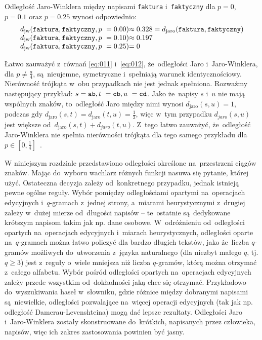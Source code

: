 \documentclass{praca1}
\begin{document}
\begin{example}
Odległość Jaro-Winklera między napisami \verb|faktura| i~\verb|faktyczny| dla $p = 0$, $p = 0.1$ oraz $p = 0.25$ wynosi odpowiednio: 
\begin{equation*}
  \left.\begin{array}{l@{}l}
    d_{\mathrm{jw}}(\verb|faktura|, \verb|faktyczny|, p~= 0.00) & \approx 0.328 = d_{\mathrm{jaro}}(\verb|faktura|, \verb|faktyczny|) \\
    d_{\mathrm{jw}}(\verb|faktura|, \verb|faktyczny|, p~= 0.10) & \approx 0.197  \\
    d_{\mathrm{jw}}(\verb|faktura|, \verb|faktyczny|, p~= 0.25) & =  0
  \end{array}\right.
\end{equation*}
\end{example}

Łatwo zauważyć z~równań \eqref{eq:011} i~\eqref{eq:012}, że~odległości Jaro i~Jaro-Winklera, dla $p \neq \frac{a}{4}$, są~nieujemne,  symetryczne i~spełniają warunek identycznościowy. Nierówność trójkąta w~obu przypadkach nie jest jednak spełniona. Rozważmy następujący przykład: $s = \verb|ab|, t~= \verb|cb|, u~= \verb|cd|$. Jako że~napisy $s$ i~$u$ nie mają wspólnych znaków, to~odległość Jaro między nimi wynosi $d_{\mathrm{jaro}}(s, u) = 1$, podczas gdy $d_{\mathrm{jaro}}(s, t) = d_{\mathrm{jaro}}(t, u) = \frac{1}{3}$, więc w~tym przypadku $d_{jaro}(s, u)$ jest większe od~$d_{\mathrm{jaro}}(s, t) + d_{jaro}(t, u)$. Z~tego łatwo zauważyć, że~odległość Jaro-Winklera nie spełnia nierówności trójkąta  dla tego samego przykładu dla $p \in [0, \frac{1}{4}]$~\cite{Loo2014:stringdist}.


W niniejszym rozdziale przedstawiono odległości określone na~przestrzeni ciągów znaków. Mając do~wyboru wachlarz różnych funkcji nasuwa się pytanie, której użyć. Ostateczna decyzja zależy od~konkretnego przypadku, jednak istnieją pewne ogólne reguły. Wybór pomiędzy odległościami opartymi na~operacjach edycyjnych i~$q$-gramach z~jednej strony, a~miarami heurystycznymi z~drugiej zależy w~dużej mierze od~długości napisów -- te~ostatnie są~dedykowane krótszym napisom takim jak np. dane osobowe. W~odróżnieniu od~odległości opartych na~operacjach edycyjnych i~miarach heurystycznych, odległości oparte na~$q$-gramach można łatwo policzyć dla bardzo długich tekstów, jako że~liczba $q$-gramów możliwych do~utworzenia z~języka naturalnego (dla niezbyt małego $q$, tj. $q \geq 3$) jest z~reguły o~wiele mniejsza niż liczba $q$-gramów, którą można otrzymać z~całego alfabetu. Wybór pośród odległości opartych na~operacjach edycyjnych zależy przede wszystkim od~dokładności jaką chce się otrzymać. Przykładowo do~wyszukiwania haseł w~słowniku, gdzie różnice między dobranymi napisami są~niewielkie, odległości pozwalające na~więcej operacji edycyjnych (tak jak np. odległość Damerau-Levenshteina) mogą dać lepsze rezultaty. Odległości Jaro i~Jaro-Winklera zostały skonstruowane do~krótkich, napisanych przez człowieka, napisów, więc ich zakres zastosowania powinien być jasny.
\end{document}
